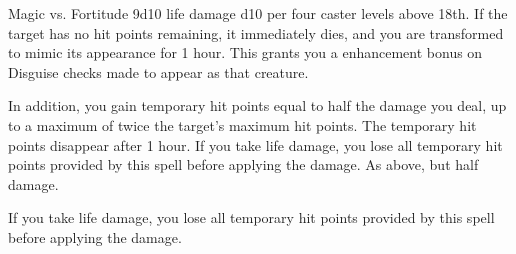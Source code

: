 \begin{spellheader}
\end{spellheader}
\begin{spellcontent}
    \begin{spelltargetinginfo}
    \end{spelltargetinginfo}
    \begin{spelleffects}
        \begin{spellattack}{Magic vs. Fortitude}
            \spellsuccess 9d10 life damage \add d10 per four caster levels above 18th. If the target has no hit points remaining, it immediately dies, and you are transformed to mimic its appearance for 1 hour. This grants you a  enhancement bonus on Disguise checks made to appear as that creature.

            In addition, you gain temporary hit points equal to half the damage you deal, up to a maximum of twice the target's maximum hit points. The temporary hit points disappear after 1 hour. If you take life damage, you lose all temporary hit points provided by this spell before applying the damage.
            \spellfailure As above, but half damage.
        \end{spellattack}
    \end{spelleffects}
\end{spellcontent}
\begin{spellfooter}
    \spellnotes If you take life damage, you lose all temporary hit points provided by this spell before applying the damage.
\end{spellfooter}

